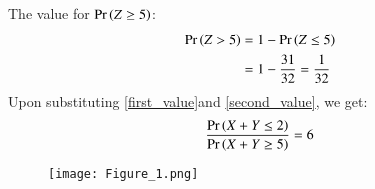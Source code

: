 \documentclass[journal,12pt,twocolumn]{IEEEtran}
\begin{document}
The value for $\Pr\left(Z\geq 5\right)$:
\begin{align}
    \Pr\left(Z>5\right)&=1-\Pr\left(Z\leq 5\right)\\
    &=1-\frac{31}{32}=\frac{1}{32}\label{second_value}
\end{align}
Upon substituting \eqref{first_value}and \eqref{second_value}, we get:
\begin{align}
    \frac{\Pr\left(X+Y \leq 2\right)}{\Pr\left(X+Y \geq 5\right)} = 6
\end{align}
\begin{figure}[h]
    \centering
    \texttt{[image: Figure\_1.png]}
    \caption{}
    \label{fig:my_label}
\end{figure}
\end{document}
